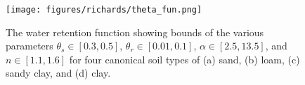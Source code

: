 \begin{figure}[ht]
\begin{center}
\texttt{[image: figures/richards/theta\_fun.png]}
\end{center}
\caption{
    The water retention function showing bounds of the various parameters
    $\theta_s \in [0.3, 0.5]$, $\theta_r \in [0.01, 0.1]$, $\alpha \in [2.5, 13.5]$, and $n \in [1.1, 1.6]$
    for four canonical soil types of (a) sand, (b) loam, (c) sandy clay, and (d) clay.
}
\label{fig:richards-theta_fun}
\end{figure}
